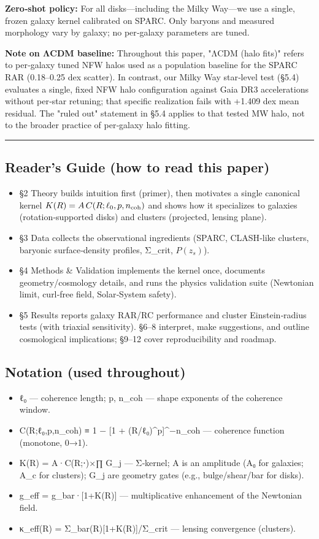 \documentclass[11pt,a4paper]{article}
\begin{document}
\textbf{Zero‑shot policy:} For all disks—including the Milky Way—we use a single, frozen galaxy kernel calibrated on SPARC. Only baryons and measured morphology vary by galaxy; no per‑galaxy parameters are tuned.


\textbf{Note on ΛCDM baseline:} Throughout this paper, "ΛCDM (halo fits)" refers to per‑galaxy tuned NFW halos used as a population baseline for the SPARC RAR (0.18–0.25 dex scatter). In contrast, our Milky Way star‑level test (§5.4) evaluates a single, fixed NFW halo configuration against Gaia DR3 accelerations without per‑star retuning; that specific realization fails with +1.409 dex mean residual. The "ruled out" statement in §5.4 applies to that tested MW halo, not to the broader practice of per‑galaxy halo fitting.


\medskip\hrule\medskip


\subsection{Reader’s Guide (how to read this paper)}


\begin{itemize}
\item §2 Theory builds intuition first (primer), then motivates a single canonical kernel $K(R)=A\,C(R;\ell_0,p,n_{\rm coh})$ and shows how it specializes to galaxies (rotation‑supported disks) and clusters (projected, lensing plane).
\item §3 Data collects the observational ingredients (SPARC, CLASH‑like clusters, baryonic surface‑density profiles, Σ\_crit, $P(z_s)$).
\item §4 Methods \& Validation implements the kernel once, documents geometry/cosmology details, and runs the physics validation suite (Newtonian limit, curl‑free field, Solar‑System safety).
\item §5 Results reports galaxy RAR/RC performance and cluster Einstein‑radius tests (with triaxial sensitivity). §6–8 interpret, make suggestions, and outline cosmological implications; §9–12 cover reproducibility and roadmap.
\end{itemize}


\subsection{Notation (used throughout)}


\begin{itemize}
\item ℓ₀ — coherence length; p, n\_coh — shape exponents of the coherence window.
\item C(R;ℓ₀,p,n\_coh) ≡ 1 − [1 + (R/ℓ₀)^p]^{−n\_coh} — coherence function (monotone, 0→1).
\item K(R) = A·C(R;⋅)×∏ G\_j — Σ‑kernel; A is an amplitude (A₀ for galaxies; A\_c for clusters); G\_j are geometry gates (e.g., bulge/shear/bar for disks).
\item g\_eff = g\_bar·[1+K(R)] — multiplicative enhancement of the Newtonian field.
\item κ\_eff(R) = Σ\_bar(R)[1+K(R)]/Σ\_crit — lensing convergence (clusters).
\end{itemize}
\end{document}
